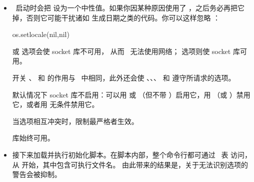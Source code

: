 \begin{itemize}
    最后，它会无条件禁用  库（但不禁用  库，
    后者始终可用）。

    从 1.18.0 版起，若使用了 \KPATHSEA，则除  外，
     库默认不启用；可以用  开关启用它。
    在 shell-escape 模式下， 库总是启用的。

    同样从 1.18.0 版起，若使用了 \KPATHSEA，则当 
    和  都校验通过某个路径名时，
    函数 、、、
    、、、、
    、、、
    、 返回 ；
    其中 、 和 
    只通过  校验。

\item \LUATEX\ 启动时会把  设为一个中性值。如果你因某种原因使用了
    ，之后务必再把它  掉，否则它可能干扰诸如
    生成日期之类的代码。你可以这样忽略 ：

    \begin{typing}
    os.setlocale(nil,nil)
    \end{typing}

     或  选项会使 socket 库不可用，
    从而 \LUA\ 无法使用网络； 选项则使 socket 库可用。

    开关 、 和
     的作用与 \PDFTEX\ 中相同，此外还会使
    、、、
    和  遵守所请求的选项。

    默认情况下 socket 库不启用：可以用  或 
    （但不带 ）启用它，用 
    （或 ）禁用它，或者用  无条件禁用它。

    当选项相互冲突时，限制最严格者生效。

     库始终可用。

\item 接下来加载并执行初始化脚本。在脚本内部，整个命令行都可通过 \LUA\ 表
     访问，从  开始，其中包含可执行文件名。
    由此带来的结果是，关于无法识别选项的警告会被抑制。

\end{itemize}

